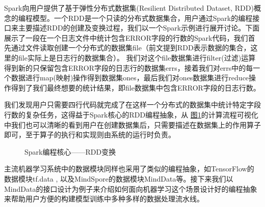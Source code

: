 \documentclass[letterpaper,10pt,english]{sphinxmanual}
\let\sphinxpxdimen\pdfpxdimen\else\newdimen\sphinxpxdimen
\begin{document}
\sphinxAtStartPar
Spark向用户提供了基于弹性分布式数据集(Resilient Distributed Dataset,
RDD)概念的编程模型。一个RDD是一个只读的分布式数据集合，用户通过Spark的编程接口来主要描述RDD的创建及变换过程，我们以一个Spark示例进行展开讨论。下面展示了一段在一个日志文件中统计包含ERROR字段的行数的Spark代码，我们首先通过文件读取创建一个分布式的数据集file（前文提到RDD表示数据的集合，这里的file实际上是日志行的数据集合）。
我们对这个file数据集进行filter(过滤)运算得到新的只保留包含ERROR字段的日志行的数据集errs，接着我们对errs中的每一个数据进行map(映射)操作得到数据集ones，最后我们对ones数据集进行reduce操作得到了我们最终想要的统计结果，即file数据集中包含ERROR字段的日志行数。

\begin{sphinxVerbatim}[commandchars=\\\{\}]
   
   
     
   
\end{sphinxVerbatim}

\sphinxAtStartPar
我们发现用户只需要四行代码就完成了在这样一个分布式的数据集中统计特定字段行数的复杂任务，这得益于Spark核心的RDD编程抽象，从
\hyperref[\detokenize{chapter_data_processing/program_model:rdd-transformation-example}]{图\ref{\detokenize{chapter_data_processing/program_model:rdd-transformation-example}}}的计算流程可视化中我们也可以清晰的看到用户在创建数据集后，只需要描述在数据集上的作用算子即可，至于算子的执行和实现则由系统的运行时负责。

\begin{figure}[H]
\centering
\capstart

\noindent\sphinxincludegraphics[width=800\sphinxpxdimen]{{RDD}.png}
\caption{Spark编程核心——RDD变换}\label{\detokenize{chapter_data_processing/program_model:id11}}\label{\detokenize{chapter_data_processing/program_model:rdd-transformation-example}}\end{figure}

\sphinxAtStartPar
主流机器学习系统中的数据模块同样也采用了类似的编程抽象，如TensorFlow的数据模块tf.data
,
以及MindSpore的数据模块MindData等。接下来我们以MindData的接口设计为例子来介绍如何面向机器学习这个场景设计好的编程抽象来帮助用户方便的构建模型训练中多种多样的数据处理流水线。
\end{document}
